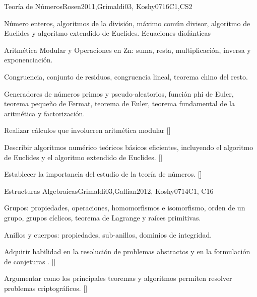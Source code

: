 \begin{syllabus}
\begin{unit}{}{Teoría de Números}{Rosen2011,Grimaldi03, Koshy07}{16}{C1,CS2}
   \begin{topics}
    	\item Número enteros, algoritmos de la división, máximo común divisor, algoritmo de Euclides y algoritmo extendido de Euclides. Ecuaciones diofánticas
    	\item Aritmética Modular y Operaciones en Zn: suma, resta, multiplicación, inversa y exponenciación.
	\item Congruencia, conjunto de residuos, congruencia lineal, teorema chino del resto.
	\item Generadores de números primos y pseudo-aleatorios, función phi de Euler, teorema pequeño de Fermat, teorema de Euler, teorema fundamental de la aritmética y factorización.			
   \end{topics}
   \begin{learningoutcomes}
      	\item  Realizar cálculos que involucren aritmética modular [\Usage]
	\item  Describir algoritmos numérico teóricos básicos eficientes, incluyendo el algoritmo de Euclides y el algoritmo extendido de Euclides. [\Assessment]
	\item Establecer la importancia del estudio de la teoría de números. [\Familiarity]
	\item \IASCryptographyLODiscussThePrime [\Familiarity]
   \end{learningoutcomes}
\end{unit}

\begin{unit}{}{Estructuras Algebraicas}{Grimaldi03,Gallian2012, Koshy07}{14}{C1, C16}
   \begin{topics}
    	\item Grupos: propiedades, operaciones, homomorfismos e isomorfismo, orden de un grupo, grupos cíclicos, teorema de Lagrange y raíces primitivas.
    	\item Anillos y cuerpos: propiedades, sub-anillos, dominios de integridad.
   \end{topics}
   \begin{learningoutcomes}
	\item  Adquirir habilidad en la resolución de problemas abstractos y en la formulación de conjeturas . [\Familiarity]
	\item Argumentar como los principales teoremas y algoritmos permiten resolver problemas criptográficos. [\Assessment]
   \end{learningoutcomes}
\end{unit}


\end{syllabus}
